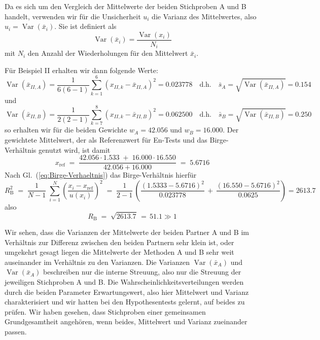 Da es sich um den Vergleich der Mittelwerte der beiden Stichproben A und B handelt, verwenden wir
für die Unsicherheit $u_i$ die Varianz des Mittelwertes, also
$u_i = \operatorname{Var}(\bar x_i)$. Sie ist definiert als
$$
\operatorname{Var}(\bar x_i) = \frac{\operatorname{Var}(x_i)}{N_i}
$$
mit $N_i$ den Anzahl der Wiederholungen für den Mittelwert $\bar x_i$.

Für Beispiel II erhalten wir dann folgende Werte:
$$
\operatorname{Var}(\bar x_{II,A}) = \frac{1}{6(6-1)} \sum\limits_{k=1}^{6} \left(x_{II,k} - \bar x_{II,A} \right)^2 = 0.023778
\quad \text{d.h.} \quad \bar s_A = \sqrt{\operatorname{Var}(\bar x_{II,A})} = 0.154
$$
und
$$
\operatorname{Var}(\bar x_{II,B}) = \frac{1}{2(2-1)} \sum\limits_{k=7}^{8} \left(x_{II,k} - \bar x_{II,B} \right)^2 = 0.062500
\quad \text{d.h.} \quad \bar s_B = \sqrt{\operatorname{Var}(\bar x_{II,B})} = 0.250
$$
so erhalten wir für die beiden Gewichte $w_A = 42.056$ und $w_B = 16.000$.
Der gewichtete Mittelwert, der als Referenzwert für En-Tests und das Birge-Verhältnis genutzt wird, ist damit
$$
x_\mathrm{ref} \; = \; \frac{42.056 \cdot 1.533 \; + \; 16.000 \cdot 16.550}{42.056 + 16.000}
\; = \; 5.6716
$$
Nach Gl.~(\ref{eq:Birge-Verhaeltnis}) das Birge-Verhältnis hierfür
$$
R^2_\mathrm{B} \; = \; \frac{1}{N-1} \; \sum_{i=1}^N \left( \frac{x_i-x_\mathrm{ref}}{u(x_i)} \right)^2 \; = \;
 \frac{1}{2-1} \, \left( \frac{\left(1.5333 - 5.6716\right)^2}{0.023778}
 \, + \, \frac{ \left( 16.550 - 5.6716 \right)^2}{0.0625} \right) = 2613.7
$$
also
$$
R_\mathrm{B} \; = \; \sqrt{2613.7} \, = \, 51.1  \gg 1
$$


Wir sehen, dass die Varianzen der Mittelwerte der beiden Partner A und B im Verhältnis zur
Differenz zwischen den beiden Partnern sehr klein ist, oder umgekehrt gesagt liegen die
Mittelwerte der Methoden A und B sehr weit auseinander im Verhältnis zu den Varianzen.
Die Varianzen $\operatorname{Var}(\bar x_A)$ und $\operatorname{Var}(\bar x_A)$ beschreiben
nur die interne Streuung, also nur die Streuung der jeweiligen Stichproben A und B.
Die Wahrscheinlichkeitsverteilungen werden durch die beiden Parameter Erwartungswert,
also hier Mittelwert und Varianz charakterisiert und wir hatten bei den Hypothesentests
gelernt, auf beides zu prüfen. Wir haben gesehen, dass Stichproben einer gemeinsamen
Grundgesamtheit angehören, wenn beides, Mittelwert und Varianz zueinander passen.

